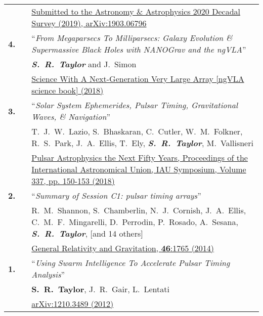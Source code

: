 \documentclass[11pt,letterpaper,sans]{moderncv}
\begin{document}
{\begin{longtable}{rp{0.3cm}p{15.8cm}}
&& {\color{color1} \href{https://arxiv.org/abs/1903.06796}{Submitted to the Astronomy \& Astrophysics 2020 Decadal Survey (2019), arXiv:1903.06796}} \vspace{0.09cm}\\
\textbf{4.} & & ``\textit{From Megaparsecs To Milliparsecs: Galaxy Evolution \& Supermassive Black Holes with NANOGrav and the ngVLA}'' \\ 
&& \textit{\textbf{S.~R.~Taylor}} and J.~Simon \\ 
&& \href{http://ngvla.nrao.edu/page/scibook}{{\color{color1} Science With A Next-Generation Very Large Array [ngVLA science book] (2018)}} \vspace{0.09cm}\\
\textbf{3.} & & ``\textit{Solar System Ephemerides, Pulsar Timing, Gravitational Waves, \& Navigation}'' \\ 
&& T.~J.~W.~Lazio, S.~Bhaskaran, C.~Cutler, W.~M.~Folkner, R.~S.~Park, J.~A.~Ellis, T.~Ely, \textit{\textbf{S.~R.~Taylor}}, M.~Vallisneri \\ 
&& \href{https://doi.org/10.1017/S1743921317009711}{{\color{color1} Pulsar Astrophysics the Next Fifty Years, Proceedings of the International Astronomical Union, IAU Symposium, Volume 337, pp. 150-153 (2018)}} \vspace{0.09cm}\\
\textbf{2.} & & ``\textit{Summary of Session C1: pulsar timing arrays}'' \\ 
&& R.~M.~Shannon, S.~Chamberlin, N.~J.~Cornish, J.~A.~Ellis, C.~M.~F.~Mingarelli, D.~Perrodin, P.~Rosado, A.~Sesana, \textit{\textbf{S.~R.~Taylor}}, [and 14 others] \\ 
&& \href{http://link.springer.com/article/10.1007\%2Fs10714-014-1765-4}{{\color{color1} General Relativity and Gravitation, \textbf{46}:1765 (2014)}} \vspace{0.09cm}\\
\textbf{1.} & & ``\textit{Using Swarm Intelligence To Accelerate Pulsar Timing Analysis}'' \\ 
&& \textbf{S.~R.~Taylor}, J.~R.~Gair, L.~Lentati \\ 
&& \href{https://arxiv.org/abs/1210.3489}{{\color{color1} arXiv:1210.3489 (2012)}} \vspace{0.09cm}\\
\end{longtable}
}


\pagebreak
\end{document}
